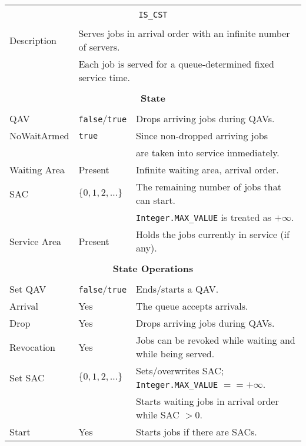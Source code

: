 \documentclass[12pt]{book}
\begin{document}
\begin{tabular}{|l|l|l|}
\hline
\multicolumn{3}{|c|}{} \\
\multicolumn{3}{|c|}{\lstinline[basicstyle=\large]{IS_CST}} \\
\multicolumn{3}{|c|}{} \\
\hline
Description & \multicolumn{2}{|l|}{Serves jobs in arrival order with an infinite number of servers.} \\
            & \multicolumn{2}{|l|}{Each job is served for a queue-determined fixed service time.} \\
\hline
\multicolumn{3}{|c|}{} \\
\multicolumn{3}{|c|}{\bf State} \\
\multicolumn{3}{|c|}{} \\
\hline
QAV & \lstinline|false|/\lstinline|true| & Drops arriving jobs during QAVs. \\
\hline
NoWaitArmed & \lstinline|true| & Since non-dropped arriving jobs \\
            &                  & are taken into service immediately. \\
\hline
Waiting Area & Present & Infinite waiting area, arrival order. \\
\hline
SAC & $\{0, 1, 2, \ldots\}$ & The remaining number of jobs that can start. \\
    &                       & \lstinline|Integer.MAX_VALUE| is treated as $+\infty$. \\
\hline
Service Area & Present & Holds the jobs currently in service (if any). \\
\hline
\multicolumn{3}{|c|}{} \\
\multicolumn{3}{|c|}{\bf State Operations} \\
\multicolumn{3}{|c|}{} \\
\hline
Set QAV & \lstinline|false|/\lstinline|true| & Ends/starts a QAV. \\
\hline
Arrival & Yes & The queue accepts arrivals. \\
\hline
Drop & Yes & Drops arriving jobs during QAVs. \\
\hline
Revocation & Yes & Jobs can be revoked while waiting and while being served. \\
\hline
Set SAC & $\{0, 1, 2, \ldots\}$ & Sets/overwrites SAC; \lstinline|Integer.MAX_VALUE| $== +\infty$. \\
        &                       & Starts waiting jobs in arrival order while SAC $> 0$. \\
\hline
Start & Yes & Starts jobs if there are SACs. \\

\end{tabular}
\end{document}
